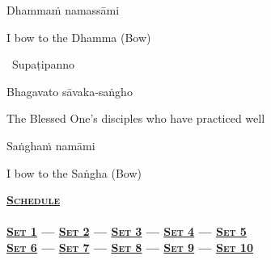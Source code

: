 Dhammaṁ namassāmi

\begin{english}
  I bow to the Dhamma \hfill{\textnormal{\ifafive\fontsize{12.5}{18}\fi\ifninebythirteen\fontsize{9}{13}\fi\selectfont (Bow)}}
\end{english}

\begin{leader}
  \anglebracketleft\ \hspace{-0.5mm}Supaṭipanno \hspace{-0.5mm}\anglebracketright\
\end{leader}

\ifninebythirteen
  \vspace{-0.25cm}
\else
  \vspace{-0.5cm}
\fi

Bhagavato sāvaka-saṅgho

\begin{english}
  The Blessed One's disciples who have practiced well
\end{english}

Saṅghaṁ namāmi

\begin{english}
  I bow to the Saṅgha \hfill{\textnormal{\ifafive\fontsize{12.5}{18}\fi\ifninebythirteen\fontsize{9}{13}\fi\selectfont (Bow)}}\\
\end{english}

\suttaRef{[Thai]}

\null
\vfill

\ifdigital
  \begin{minipage}[b][25pt][c]{\linewidth}
    \begin{leader}
      \textbf{\vspace{0.2em}\textsc{\hyperref[schedule]{Schedule}\\
          {\centering{}}\\
          \vspace{0.8em}
          \hyperref[buddhas-first-exclamation]{Set 1} \hspace{0.02cm} — \hspace{0.02cm} \hyperref[characteristic-of-not-self]{Set 2} \hspace{0.02cm} — \hspace{0.02cm} \hyperref[noble-eightfold-path]{Set 3} \hspace{0.02cm} — \hspace{0.02cm} \hyperref[dedication-of-offerings]{Set 4} \hspace{0.02cm} — \hspace{0.02cm} \hyperref[mindfulness-of-breathing]{Set 5}\\
          \vspace{0.5em}
          \hyperref[anatta-lakkhana]{Set 6} — \hyperref[dependent-origination]{Set 7} — \hyperref[aditta-pariyaya]{Set 8} — \hyperref[invitation-to-the-devas]{Set 9} — \hyperref[passage-on-preliminary-paying-of-homage-funeral]{Set 10}}}
    \end{leader}
  \end{minipage}
\fi

\ifbfive
  \cleardoublepage
\fi

